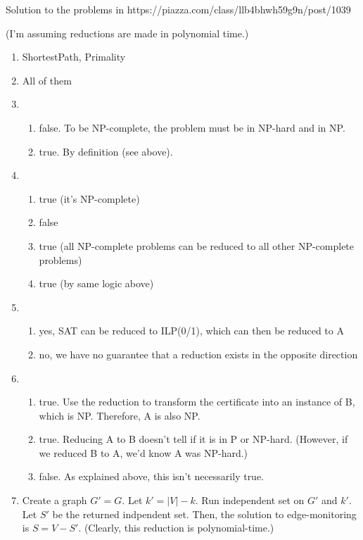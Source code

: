 \documentclass[11pt]{article}
\begin{document}
Solution to the problems in https://piazza.com/class/llb4bhwh59g9n/post/1039

(I'm assuming reductions are made in polynomial time.)

\begin{enumerate}
    \item ShortestPath, Primality
    \item All of them
    \item 
    \begin{enumerate}
        \item false. To be NP-complete, the problem must be in NP-hard and in NP.
        \item true. By definition (see above).
    \end{enumerate}
    \item 
    \begin{enumerate}
        \item true (it's NP-complete)
        \item false
        \item true (all NP-complete problems can be reduced to all other NP-complete problems)
        \item true (by same logic above)
    \end{enumerate}
    \item 
    \begin{enumerate}
        \item yes, SAT can be reduced to ILP(0/1), which can then be reduced to A
        \item no, we have no guarantee that a reduction exists in the opposite direction
    \end{enumerate}
    \item 
    \begin{enumerate}
        \item true. Use the reduction to transform the certificate into an instance of B, which is NP. Therefore, A is also NP.
        \item true. Reducing A to B doesn't tell if it is in P or NP-hard. (However, if we reduced B to A, we'd know A was NP-hard.)
        \item false. As explained above, this isn't necessarily true.
    \end{enumerate}
    \item Create a graph $G' = G$. Let $k' = |V| - k$. Run independent set on $G'$ and $k'$. Let $S'$ be the returned indpendent set. Then, the solution to edge-monitoring is $S = V - S'$. (Clearly, this reduction is polynomial-time.)


\end{enumerate}
\end{document}
